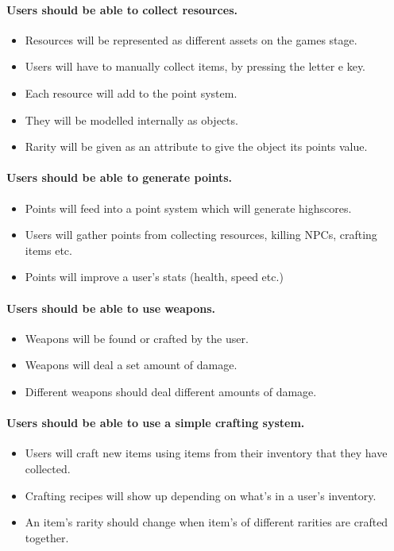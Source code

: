 \documentclass{article}
\begin{document}
\paragraph{Users should be able to collect resources.}
\begin{itemize}
	\item Resources will be represented as different assets on the games stage.
	\item Users will have to manually collect items, by pressing the letter e key.
	\item Each resource will add to the point system.
	\item They will be modelled internally as objects.
	\item Rarity will be given as an attribute to give the object its points value.
\end{itemize}

\paragraph{Users should be able to generate points.}
\begin{itemize}
	\item Points will feed into a point system which will generate highscores.
	\item Users will gather points from collecting resources, killing NPCs, crafting items etc.
	\item Points will improve a user's stats (health, speed etc.)
\end{itemize}

\paragraph{Users should be able to use weapons.}
\begin{itemize}
	\item Weapons will be found or crafted by the user.
	\item Weapons will deal a set amount of damage.
	\item Different weapons should deal different amounts of damage.
\end{itemize}

\paragraph{Users should be able to use a simple crafting system.}
\begin{itemize}
	\item Users will craft new items using items from their inventory that they have collected.
	\item Crafting recipes will show up depending on what’s in a user's inventory.
	\item An item’s rarity should change when item’s of different rarities are crafted together.
\end{itemize}
\end{document}

